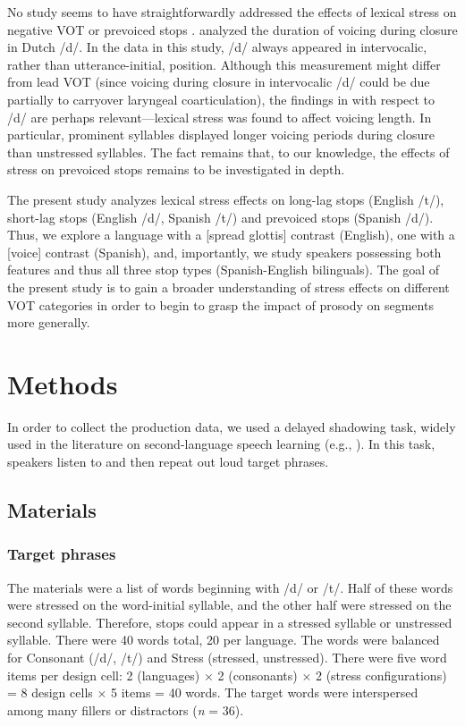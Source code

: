\documentclass[a4paper]{article}
\begin{document}
No study seems to have straightforwardly addressed the effects of lexical stress on negative VOT or prevoiced stops \cite[cf.]{Castaneda:1986eu, Poch:1985bv}. \cite{cho2005prosodic} analyzed the duration of voicing during closure in Dutch /d/. In the data in this study, /d/ always appeared in intervocalic, rather than utterance-initial, position. Although this measurement might differ from lead VOT (since voicing during closure in intervocalic /d/ could be due partially to carryover laryngeal coarticulation), the findings in \cite{cho2005prosodic} with respect to /d/ are perhaps relevant---lexical stress was found to affect voicing length. In particular, prominent syllables displayed longer voicing periods during closure than unstressed syllables. The fact remains that, to our knowledge, the effects of stress on prevoiced stops remains to be investigated in depth.

The present study analyzes lexical stress effects on long-lag stops (English /t/), short-lag stops (English /d/, Spanish /t/) and prevoiced stops (Spanish /d/). Thus, we explore a language with a [spread glottis] contrast (English), one with a [voice] contrast (Spanish), and, importantly, we study speakers possessing both features and thus all three stop types (Spanish-English bilinguals). The goal of the present study is to gain a broader understanding of stress effects on different VOT categories in order to begin to grasp the impact of prosody on segments more generally.

\section{Methods}

In order to collect the production data, we used a delayed shadowing task, widely used in the literature on second-language speech learning (e.g., \cite{guion2003vowel}). In this task, speakers listen to and then repeat out loud target phrases.

\subsection{Materials}

\subsubsection{Target phrases}

The materials were a list of words beginning with /d/ or /t/. Half of these words were stressed on the word-initial syllable, and the other half were stressed on the second syllable. Therefore, stops could appear in a stressed syllable or unstressed syllable. There were 40 words total, 20 per language. The words were balanced for Consonant (/d/, /t/) and Stress (stressed, unstressed). There were five word items per design cell: 2 (languages) $\times$ 2 (consonants) $\times$ 2 (stress configurations) = 8 design cells $\times$ 5 items = 40 words. The target words were interspersed among many fillers or distractors (\emph{n} = 36).
\end{document}

